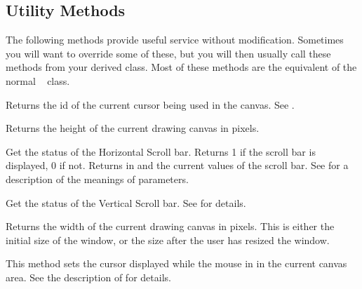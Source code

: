 \subsection* {Utility Methods} %

The following methods provide useful service without modification. Sometimes
you will want to override some of these, but you will then usually
call these methods from your derived class. Most of these methods
are the equivalent of the normal \V\  class.


Returns the id of the current cursor being used in the canvas.
See .


Returns the height of the current drawing canvas in pixels.


Get the status of the Horizontal Scroll bar. Returns 1 if the
scroll bar is displayed, 0 if not. Returns in  and
 the current values of the scroll bar. See 
for a description of the meanings of parameters.


Get the status of the Vertical Scroll bar. See
 for details.


Returns the width of the current drawing canvas in pixels.
This is either the initial size of the window, or the size
after the user has resized the window.


This method sets the cursor displayed while the mouse in
in the current canvas area.
See the description of  for details.


